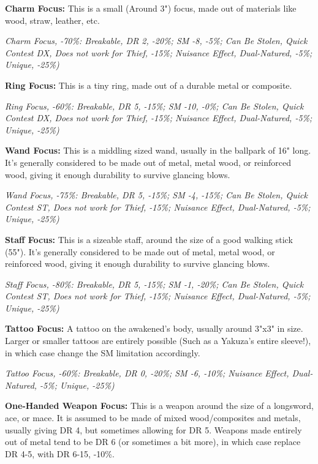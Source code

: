 \begin{multicols*}{2}
	\textbf{Charm Focus:} This is a small (Around 3") focus, made out of materials like wood, straw, leather, etc.
	
	\textcolor{OliveGreen}{\textit{Charm Focus, -70\%: Breakable, DR 2, -20\%; SM -8, -5\%; Can Be Stolen, Quick Contest DX, Does not work for Thief, -15\%; Nuisance Effect, Dual-Natured, -5\%; Unique, -25\%)}}
	
	\textbf{Ring Focus:} This is a tiny ring, made out of a durable metal or composite.
	
	\textcolor{OliveGreen}{\textit{Ring Focus, -60\%: Breakable, DR 5, -15\%; SM -10, -0\%; Can Be Stolen, Quick Contest DX, Does not work for Thief, -15\%; Nuisance Effect, Dual-Natured, -5\%; Unique, -25\%)}}
	
	\textbf{Wand Focus:} This is a middling sized wand, usually in the ballpark of 16" long. It's generally considered to be made out of metal, metal wood, or reinforced wood, giving it enough durability to survive glancing blows.
	
	\textcolor{OliveGreen}{\textit{Wand Focus, -75\%: Breakable, DR 5, -15\%; SM -4, -15\%; Can Be Stolen, Quick Contest ST, Does not work for Thief, -15\%; Nuisance Effect, Dual-Natured, -5\%; Unique, -25\%)}}
	
	\textbf{Staff Focus:} This is a sizeable staff, around the size of a good walking stick (55"). It's generally considered to be made out of metal, metal wood, or reinforced wood, giving it enough durability to survive glancing blows.
	
	\textcolor{OliveGreen}{\textit{Staff Focus, -80\%: Breakable, DR 5, -15\%; SM -1, -20\%; Can Be Stolen, Quick Contest ST, Does not work for Thief, -15\%; Nuisance Effect, Dual-Natured, -5\%; Unique, -25\%)}}
	
	\textbf{Tattoo Focus:} A tattoo on the awakened's body, usually around 3"x3" in size. Larger or smaller tattoos are entirely possible (Such as a Yakuza's entire sleeve!), in which case change the SM limitation accordingly.
	
	\textcolor{OliveGreen}{\textit{Tattoo Focus, -60\%: Breakable, DR 0, -20\%; SM -6, -10\%; Nuisance Effect, Dual-Natured, -5\%; Unique, -25\%)}}
	
	\textbf{One-Handed Weapon Focus:} This is a weapon around the size of a longsword, ace, or mace. It is assumed to be made of mixed wood/composites and metals, usually giving DR 4, but sometimes allowing for DR 5. Weapons made entirely out of metal tend to be DR 6 (or sometimes a bit more), in which case replace DR 4-5, with DR 6-15, -10\%.
	

\end{multicols*}
